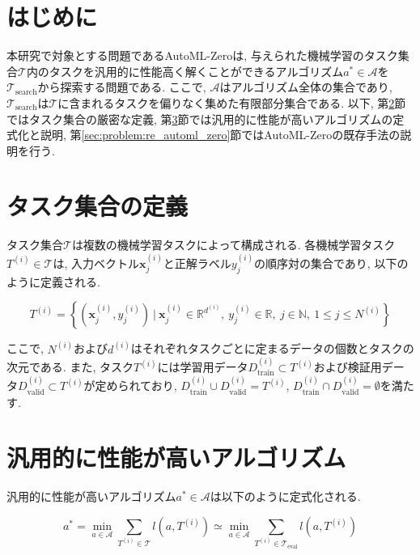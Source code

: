 \documentclass[11pt,oneside,openany,report]{jsbook}
\begin{document}
\section{はじめに}

本研究で対象とする問題であるAutoML-Zeroは, 与えられた機械学習のタスク集合$\mathcal{T}$内のタスクを汎用的に性能高く解くことができるアルゴリズム$a^\ast \in \mathcal{A}$を$\mathcal{T}_\mathrm{search}$から探索する問題である. ここで, $\mathcal{A}$はアルゴリズム全体の集合であり, $\mathcal{T}_\mathrm{search}$は$\mathcal{T}$に含まれるタスクを偏りなく集めた有限部分集合である. 以下, 第\ref{sec:problem:tasksets}節ではタスク集合の厳密な定義, 第\ref{sec:problem:optimum}節では汎用的に性能が高いアルゴリズムの定式化と説明, 第\ref{sec:problem:re_automl_zero}節ではAutoML-Zeroの既存手法の説明を行う.

\section{タスク集合の定義}\label{sec:problem:tasksets}

タスク集合$\mathcal{T}$は複数の機械学習タスクによって構成される. 各機械学習タスク$T^{(i)} \in \mathcal{T}$は, 入力ベクトル$\bm{x}^{(i)}_j$と正解ラベル$y^{(i)}_j$の順序対の集合であり, 以下のように定義される.

$$
  T^{(i)} = \left\{(\bm{x}^{(i)}_j, y^{(i)}_j) \ |\ \bm{x}^{(i)}_j \in \mathbb{R}^{d^{(i)}},\ y^{(i)}_j \in \mathbb{R},\ j \in \mathbb{N},\ 1 \le j \le N^{(i)} \right\}
$$

\noindent
ここで, $N^{(i)}$および$d^{(i)}$はそれぞれタスクごとに定まるデータの個数とタスクの次元である. また, タスク$T^{(i)}$には学習用データ$D^{(i)}_\mathrm{train} \subset T^{(i)}$および検証用データ$D^{(i)}_\mathrm{valid} \subset T^{(i)}$が定められており, $D^{(i)}_\mathrm{train} \cup D^{(i)}_\mathrm{valid} = T^{(i)} $, $D^{(i)}_\mathrm{train} \cap D^{(i)}_\mathrm{valid} = \emptyset$を満たす.


\section{汎用的に性能が高いアルゴリズム}\label{sec:problem:optimum}

汎用的に性能が高いアルゴリズム$a^\ast \in \mathcal{A}$は以下のように定式化される.

$$
  a^\ast = \min_{a \in \mathcal{A}} \sum_{T^{(i)} \in \mathcal{T}} l(a, T^{(i)}) \simeq \min_{a \in \mathcal{A}} \sum_{T^{(i)} \in \mathcal{T}_\mathrm{eval}} l(a, T^{(i)})
$$
\end{document}
